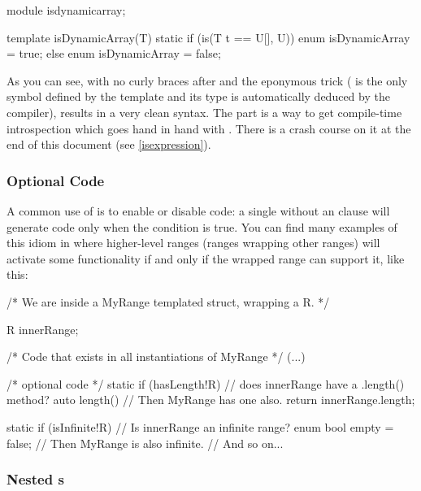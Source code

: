 \begin{dcode}
module isdynamicarray;

template isDynamicArray(T)
{
    static if (is(T t == U[], U))
        enum isDynamicArray = true;
    else
        enum isDynamicArray = false;
}
\end{dcode}

As you can see, with no curly braces after  and the eponymous trick ( is the only symbol defined by the template and its type is automatically deduced by the compiler), results in a very clean syntax. The \DD{()} part is a way to get compile-time introspection which goes hand in hand with . There is a crash course on it at the end of this document (see \autoref{isexpression}).

\subsubsection{Optional Code}

A common use of  is to enable or disable code: a single  without an  clause will generate code only when the condition is true. You can find many examples of this idiom in  where higher-level ranges (ranges wrapping other ranges) will activate some functionality if and only if the wrapped range can support it, like this:


\begin{dcode}
/* We are inside a MyRange templated struct, wrapping a R. */

    R innerRange;

/* Code that exists in all instantiations of MyRange */
(...)

/* optional code */
static if (hasLength!R) // does innerRange have a .length() method?
    auto length()       // Then MyRange has one also.
    {
        return innerRange.length;
    }

static if (isInfinite!R)     // Is innerRange an infinite range?
    enum bool empty = false; // Then MyRange is also infinite.
// And so on...
\end{dcode}

\subsubsection{\texorpdfstring{Nested s}
                              {Nested static ifs}}

